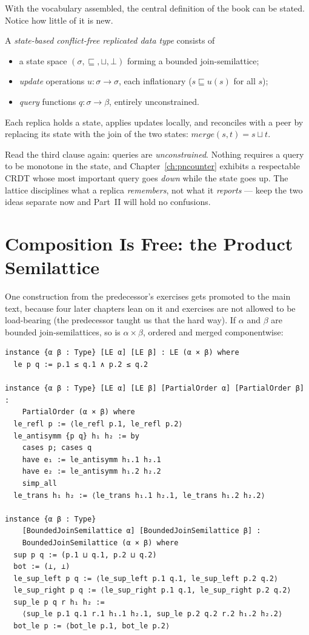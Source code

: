 \documentclass[12pt, a4paper, openright]{book}
\theoremstyle{thmstyle}
\theoremstyle{defstyle}
\newenvironment{defbox}[1][]{%
  \begin{tcolorbox}[defbox, title={Definition\ifx\\#1\\\else\ --- #1\fi}]%
}{\end{tcolorbox}}
\newcounter{exercise}[chapter]
\begin{document}
With the vocabulary assembled, the central definition of the book can
be stated. Notice how little of it is new.

\begin{defbox}[State-based CRDT]
  A \emph{state-based conflict-free replicated data type} consists of
  \begin{itemize}[nosep]
    \item a state space $(\sigma, \sqsubseteq, \sqcup, \bot)$ forming a
      bounded join-semilattice;
    \item \emph{update} operations $u : \sigma \to \sigma$, each
      inflationary ($s \sqsubseteq u(s)$ for all $s$);
    \item \emph{query} functions $q : \sigma \to \beta$, entirely
      unconstrained.
  \end{itemize}
  Each replica holds a state, applies updates locally, and reconciles
  with a peer by replacing its state with the join of the two states:
  $\mathit{merge}(s, t) = s \sqcup t$.
\end{defbox}

Read the third clause again: queries are \emph{unconstrained}. Nothing
requires a query to be monotone in the state, and
Chapter~\ref{ch:pncounter} exhibits a respectable CRDT whose most
important query goes \emph{down} while the state goes up. The lattice
disciplines what a replica \emph{remembers}, not what it \emph{reports}
--- keep the two ideas separate now and Part~II will hold no
confusions.

\section{Composition Is Free: the Product Semilattice}

One construction from the predecessor's exercises gets promoted to the
main text, because four later chapters lean on it and exercises are not
allowed to be load-bearing (the predecessor taught us that the hard
way). If $\alpha$ and $\beta$ are bounded join-semilattices, so is
$\alpha \times \beta$, ordered and merged componentwise:

\begin{verbatim}
instance {α β : Type} [LE α] [LE β] : LE (α × β) where
  le p q := p.1 ≤ q.1 ∧ p.2 ≤ q.2

instance {α β : Type} [LE α] [LE β] [PartialOrder α] [PartialOrder β] :
    PartialOrder (α × β) where
  le_refl p := ⟨le_refl p.1, le_refl p.2⟩
  le_antisymm {p q} h₁ h₂ := by
    cases p; cases q
    have e₁ := le_antisymm h₁.1 h₂.1
    have e₂ := le_antisymm h₁.2 h₂.2
    simp_all
  le_trans h₁ h₂ := ⟨le_trans h₁.1 h₂.1, le_trans h₁.2 h₂.2⟩

instance {α β : Type}
    [BoundedJoinSemilattice α] [BoundedJoinSemilattice β] :
    BoundedJoinSemilattice (α × β) where
  sup p q := (p.1 ⊔ q.1, p.2 ⊔ q.2)
  bot := (⊥, ⊥)
  le_sup_left p q := ⟨le_sup_left p.1 q.1, le_sup_left p.2 q.2⟩
  le_sup_right p q := ⟨le_sup_right p.1 q.1, le_sup_right p.2 q.2⟩
  sup_le p q r h₁ h₂ :=
    ⟨sup_le p.1 q.1 r.1 h₁.1 h₂.1, sup_le p.2 q.2 r.2 h₁.2 h₂.2⟩
  bot_le p := ⟨bot_le p.1, bot_le p.2⟩
\end{verbatim}
\end{document}
